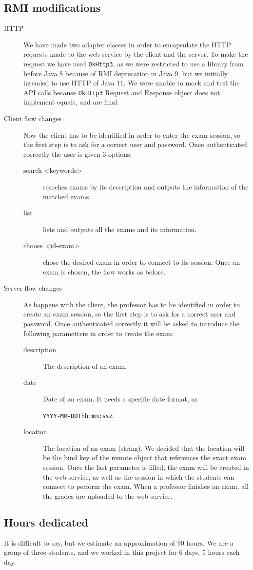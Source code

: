 \documentclass[11pt]{article}
\begin{document}
\subsection{RMI modifications}
\label{sec:org848e0b6}
\begin{description}
\item[{HTTP}] We have made two adapter classes in order to encapsulate the
HTTP requests made to the web service by the client and the server. To
make the request we have used \texttt{OkHttp3}, as we were restricted to use a
library from before Java 8 because of RMI deprecation in Java 9, but we initially intended
to use HTTP of Java 11. We were unable
to mock and test the API calls because \texttt{OkHttp3} Request and Response
object does not implement equals, and are final.

\item[{Client flow changes}] Now the client has to be identified in order to
enter the exam session, so the first step is to ask for a correct user
and password. Once authenticated correctly the user is given 3
options:

\begin{description}
\item[{search <keywords> }] searches exams by its description and outputs
the information of the matched exams.
\item[{list}] lists and outputs all the exams and its information.
\item[{choose <id-exam>}] chose the desired exam in order to connect to
its session. Once an exam is chosen, the flow works as before.
\end{description}

\item[{Server flow changes}] As happens with the client, the professor has
to be identified in order to create an exam session, so the first step
is to ask for a correct user and password. Once authenticated
correctly it will be asked to introduce the following parametters in
order to create the exam:

\begin{description}
\item[{description}] The description of an exam.
\item[{date}] Date of an exam. It needs a specific date format, as

\texttt{YYYY-MM-DDThh:mm:ssZ}.

\item[{location}] The location of an exam (string). We decided that the
location will be the bind key of the remote object that references
the exact exam session. Once the last parameter is filled, the
exam will be created in the web service, as well as the session in
which the students can connect to perform the exam. When a
professor finishes an exam, all the grades are uploaded to the web
service.
\end{description}
\end{description}

\subsection{Hours dedicated}
\label{sec:org2cca440}
It is difficult to say, but we estimate an approximation of 90 hours. We
are a group of three students, and we worked in this project for 6 days,
5 hours each day.
\end{document}
